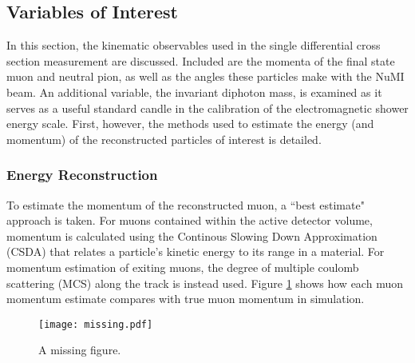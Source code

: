 \documentclass[../main.tex]{subfiles}
\begin{document}
\subsection{Variables of Interest}
\label{subsec:vars}
In this section, the kinematic observables used in the single differential cross section measurement are discussed.  Included are the momenta of the final state muon and neutral pion, as well as the angles these particles make with the NuMI beam.  An additional variable, the invariant diphoton mass, is examined as it serves as a useful standard candle in the calibration of the electromagnetic shower energy scale.  First, however, the methods used to estimate the energy (and momentum) of the reconstructed particles of interest is detailed.

\subsubsection{Energy Reconstruction}
To estimate the momentum of the reconstructed muon, a ``best estimate" approach is taken.  For muons contained within the active detector volume, momentum is calculated using the Continous Slowing Down Approximation (CSDA) that relates a particle's kinetic energy to its range in a material.  For momentum estimation of exiting muons, the degree of multiple coulomb scattering (MCS) along the track is instead used.  Figure \ref{fig:muonmomentum} shows how each muon momentum estimate compares with true muon momentum in simulation.

\begin{figure}[H]
    \center
    \texttt{[image: missing.pdf]}
    \caption[text]{A missing figure.}
    \label{fig:muonmomentum}
\end{figure}
\end{document}
